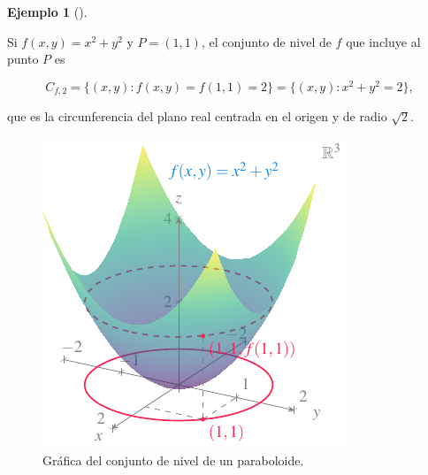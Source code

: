 \documentclass[
  a4paper,
]{scrreport}
\theoremstyle{definition}
\newtheorem{example}{Ejemplo}[chapter]
\theoremstyle{plain}
\theoremstyle{definition}
\theoremstyle{definition}
\theoremstyle{plain}
\theoremstyle{plain}
\theoremstyle{remark}
\begin{document}
\begin{example}[]\protect\hypertarget{exm-conjunto-nivel}{}\label{exm-conjunto-nivel}

Si \(f(x,y)=x^2+y^2\) y \(P=(1,1)\), el conjunto de nivel de \(f\) que
incluye al punto \(P\) es

\[
C_{f,2} = \{(x,y): f(x,y)=f(1,1)=2\} = \{(x,y): x^2+y^2=2\},
\]

que es la circunferencia del plano real centrada en el origen y de radio
\(\sqrt{2}\).

\begin{figure}[H]

{\centering \includegraphics{img/derivadas-funciones-varias-variables/curva-nivel.pdf}

}

\caption{Gráfica del conjunto de nivel de un paraboloide.}

\end{figure}%

\end{example}
\end{document}
